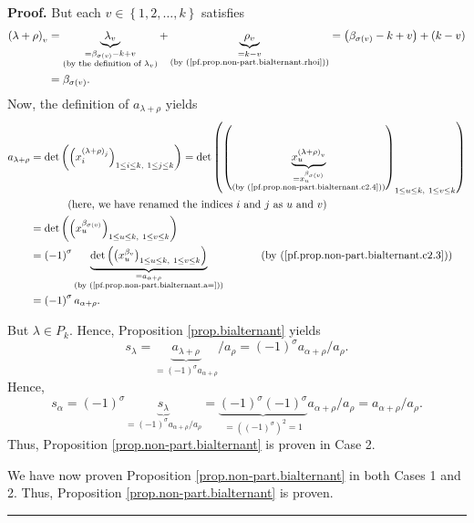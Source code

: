 \documentclass[numbers=enddot,12pt,final,onecolumn,notitlepage]{scrartcl}%
\theoremstyle{definition}
\newenvironment{proof}[1][Proof]{\noindent\textbf{#1.} }{\ \rule{0.5em}{0.5em}}
\begin{document}
\begin{proof}
But each $v\in\left\{  1,2,\ldots,k\right\}  $ satisfies
\begin{align}
\left(  \lambda+\rho\right)  _{v}  &  =\underbrace{\lambda_{v}}%
_{\substack{=\beta_{\sigma\left(  v\right)  }-k+v\\\text{(by the definition of
}\lambda_{v}\text{)}}}+\underbrace{\rho_{v}}_{\substack{=k-v\\\text{(by
(\ref{pf.prop.non-part.bialternant.rhoi}))}}}=\left(  \beta_{\sigma\left(
v\right)  }-k+v\right)  +\left(  k-v\right) \nonumber\\
&  =\beta_{\sigma\left(  v\right)  }.
\label{pf.prop.non-part.bialternant.c2.4}%
\end{align}
Now, the definition of $a_{\lambda+\rho}$ yields%
\begin{align*}
a_{\lambda+\rho}  &  =\det\left(  \left(  x_{i}^{\left(  \lambda+\rho\right)
_{j}}\right)  _{1\leq i\leq k,\ 1\leq j\leq k}\right)  =\det\left(  \left(
\underbrace{x_{u}^{\left(  \lambda+\rho\right)  _{v}}}_{\substack{=x_{u}%
^{\beta_{\sigma\left(  v\right)  }}\\\text{(by
(\ref{pf.prop.non-part.bialternant.c2.4}))}}}\right)  _{1\leq u\leq k,\ 1\leq
v\leq k}\right) \\
&  \ \ \ \ \ \ \ \ \ \ \left(  \text{here, we have renamed the indices
}i\text{ and }j\text{ as }u\text{ and }v\right) \\
&  =\det\left(  \left(  x_{u}^{\beta_{\sigma\left(  v\right)  }}\right)
_{1\leq u\leq k,\ 1\leq v\leq k}\right) \\
&  =\left(  -1\right)  ^{\sigma}\underbrace{\det\left(  \left(  x_{u}%
^{\beta_{v}}\right)  _{1\leq u\leq k,\ 1\leq v\leq k}\right)  }%
_{\substack{=a_{\alpha+\rho}\\\text{(by (\ref{pf.prop.non-part.bialternant.a=}%
))}}}\ \ \ \ \ \ \ \ \ \ \left(  \text{by
(\ref{pf.prop.non-part.bialternant.c2.3})}\right) \\
&  =\left(  -1\right)  ^{\sigma}a_{\alpha+\rho}.
\end{align*}


But $\lambda\in P_{k}$. Hence, Proposition \ref{prop.bialternant} yields
\[
s_{\lambda}=\underbrace{a_{\lambda+\rho}}_{=\left(  -1\right)  ^{\sigma
}a_{\alpha+\rho}}/a_{\rho}=\left(  -1\right)  ^{\sigma}a_{\alpha+\rho}%
/a_{\rho}.
\]
Hence,
\[
s_{\alpha}=\left(  -1\right)  ^{\sigma}\underbrace{s_{\lambda}}_{=\left(
-1\right)  ^{\sigma}a_{\alpha+\rho}/a_{\rho}}=\underbrace{\left(  -1\right)
^{\sigma}\left(  -1\right)  ^{\sigma}}_{=\left(  \left(  -1\right)  ^{\sigma
}\right)  ^{2}=1}a_{\alpha+\rho}/a_{\rho}=a_{\alpha+\rho}/a_{\rho}.
\]
Thus, Proposition \ref{prop.non-part.bialternant} is proven in Case 2.

We have now proven Proposition \ref{prop.non-part.bialternant} in both Cases 1
and 2. Thus, Proposition \ref{prop.non-part.bialternant} is proven.
\end{proof}
\end{document}
